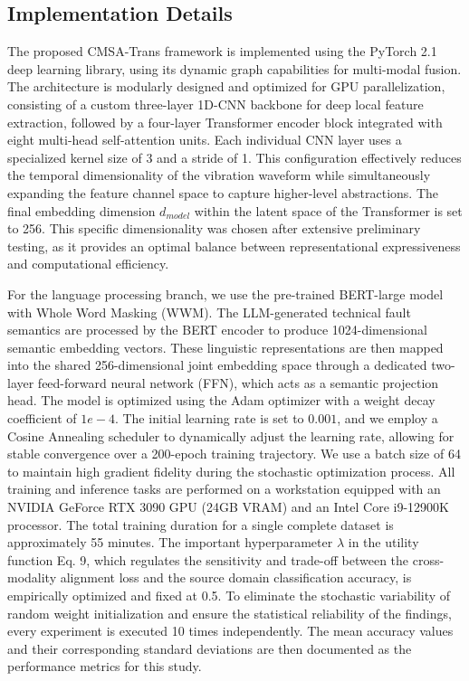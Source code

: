 {\subsection{Implementation Details}
The proposed CMSA-Trans framework is implemented using the PyTorch 2.1 deep learning library, using its dynamic graph capabilities for multi-modal fusion. The architecture is modularly designed and optimized for GPU parallelization, consisting of a custom three-layer 1D-CNN backbone for deep local feature extraction, followed by a four-layer Transformer encoder block integrated with eight multi-head self-attention units. Each individual CNN layer uses a specialized kernel size of 3 and a stride of 1. This configuration effectively reduces the temporal dimensionality of the vibration waveform while simultaneously expanding the feature channel space to capture higher-level abstractions. The final embedding dimension $d_{model}$ within the latent space of the Transformer is set to 256. This specific dimensionality was chosen after extensive preliminary testing, as it provides an optimal balance between representational expressiveness and computational efficiency.

For the language processing branch, we use the pre-trained BERT-large model with Whole Word Masking (WWM). The LLM-generated technical fault semantics are processed by the BERT encoder to produce 1024-dimensional semantic embedding vectors. These linguistic representations are then mapped into the shared 256-dimensional joint embedding space through a dedicated two-layer feed-forward neural network (FFN), which acts as a semantic projection head. The model is optimized using the Adam optimizer with a weight decay coefficient of $1e-4$. The initial learning rate is set to $0.001$, and we employ a Cosine Annealing scheduler to dynamically adjust the learning rate, allowing for stable convergence over a 200-epoch training trajectory. We use a batch size of 64 to maintain high gradient fidelity during the stochastic optimization process. All training and inference tasks are performed on a workstation equipped with an NVIDIA GeForce RTX 3090 GPU (24GB VRAM) and an Intel Core i9-12900K processor. The total training duration for a single complete dataset is approximately 55 minutes. The important hyperparameter $\lambda$ in the utility function Eq. 9, which regulates the sensitivity and trade-off between the cross-modality alignment loss and the source domain classification accuracy, is empirically optimized and fixed at 0.5. To eliminate the stochastic variability of random weight initialization and ensure the statistical reliability of the findings, every experiment is executed 10 times independently. The mean accuracy values and their corresponding standard deviations are then documented as the performance metrics for this study.

}
